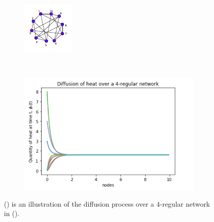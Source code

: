 \documentclass[10pt,a4paper]{article}
\begin{document}
\begin{figure}[!h]
	\centering
	\begin{subfigure}[b]{0.27\textwidth}
		\includegraphics[width=\textwidth]{images/regular-dif.pdf}
		\caption{}
		\label{regdifn-graph}
	\end{subfigure}~
	\begin{subfigure}[b]{0.45\textwidth}
		\includegraphics[width= \textwidth]{images/regular-quantity-time.png}
		\caption{}
		\label{regdifn-plot}
	\end{subfigure}
	\caption{() is an illustration of the diffusion process over a $4$-regular network in (). }
	\label{reggraph-plot}
\end{figure}
\end{document}

